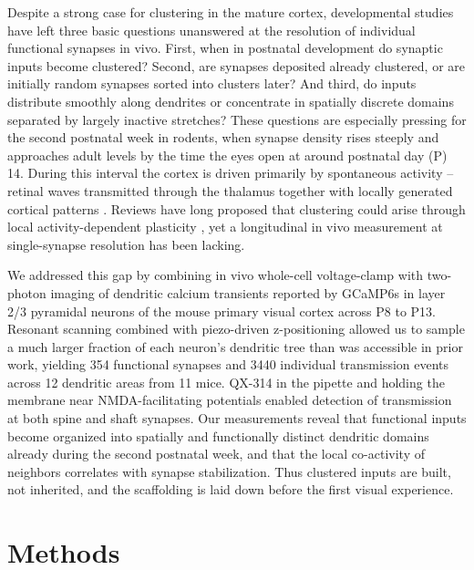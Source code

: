 \documentclass[11pt]{article}
\begin{document}
Despite a strong case for clustering in the mature cortex, developmental studies have left three basic questions unanswered at the resolution of individual functional synapses in vivo. First, when in postnatal development do synaptic inputs become clustered? Second, are synapses deposited already clustered, or are initially random synapses sorted into clusters later? And third, do inputs distribute smoothly along dendrites or concentrate in spatially discrete domains separated by largely inactive stretches? These questions are especially pressing for the second postnatal week in rodents, when synapse density rises steeply and approaches adult levels by the time the eyes open at around postnatal day (P) 14. During this interval the cortex is driven primarily by spontaneous activity -- retinal waves transmitted through the thalamus \citep{ackman2012retinal} together with locally generated cortical patterns \citep{siegel2012peripheral}. Reviews have long proposed that clustering could arise through local activity-dependent plasticity \citep{winnubst2012synaptic}, yet a longitudinal in vivo measurement at single-synapse resolution has been lacking.

We addressed this gap by combining in vivo whole-cell voltage-clamp with two-photon imaging of dendritic calcium transients reported by GCaMP6s \citep{chen2013ultrasensitive} in layer 2/3 pyramidal neurons of the mouse primary visual cortex across P8 to P13. Resonant scanning combined with piezo-driven z-positioning allowed us to sample a much larger fraction of each neuron's dendritic tree than was accessible in prior work, yielding 354 functional synapses and 3440 individual transmission events across 12 dendritic areas from 11 mice. QX-314 in the pipette \citep{takahashi2012locally} and holding the membrane near NMDA-facilitating potentials \citep{jia2010dendritic,svoboda1999spread} enabled detection of transmission at both spine and shaft synapses. Our measurements reveal that functional inputs become organized into spatially and functionally distinct dendritic domains already during the second postnatal week, and that the local co-activity of neighbors correlates with synapse stabilization. Thus clustered inputs are built, not inherited, and the scaffolding is laid down before the first visual experience.

\section{Methods}
\end{document}
